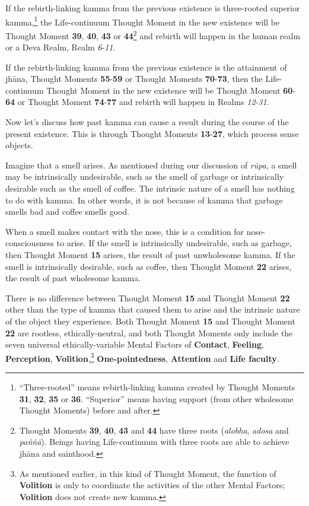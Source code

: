 If the rebirth-linking kamma from the previous existence is three-rooted superior kamma,\footnote{“Three-rooted” means rebirth-linking kamma created by Thought Moments \textbf{31}, \textbf{32}, \textbf{35} or \textbf{36}. “Superior” means having support (from other wholesome Thought Moments) before and after.} the Life-continuum Thought Moment in the new existence will be Thought Moment \textbf{39}, \textbf{40}, \textbf{43} or \textbf{44}\footnote{Thought Moments \textbf{39}, \textbf{40}, \textbf{43} and \textbf{44} have three roots (\textit{alobha}, \textit{adosa} and \textit{paññā}). Beings having Life-continuum with three roots are able to achieve jhāna and sainthood.} and rebirth will happen in the human realm or a Deva Realm, Realm \textit{6}-\textit{11}.

If the rebirth-linking kamma from the previous existence is the attainment of jhāna, Thought Moments \textbf{55}-\textbf{59} or Thought Moments \textbf{70}-\textbf{73}, then the Life-continuum Thought Moment in the new existence will be Thought Moment \textbf{60}-\textbf{64} or Thought Moment \textbf{74}-\textbf{77} and rebirth will happen in Realms \textit{12}-\textit{31}.

Now let’s discuss how past kamma can cause a result during the course of the present existence. This is through Thought Moments \textbf{13}-\textbf{27}, which process sense objects.

Imagine that a smell arises. As mentioned during our discussion of \textit{rūpa}, a smell may be intrinsically undesirable, such as the smell of garbage or intrinsically desirable such as the smell of coffee. The intrinsic nature of a smell has nothing to do with kamma. In other words, it is not because of kamma that garbage smells bad and coffee smells good.

When a smell makes contact with the nose, this is a condition for nose-consciousness to arise. If the smell is intrinsically undesirable, such as garbage, then Thought Moment \textbf{15} arises, the result of past unwholesome kamma. If the smell is intrinsically desirable, such as coffee, then Thought Moment \textbf{22} arises, the result of past wholesome kamma.

There is no difference between Thought Moment \textbf{15} and Thought Moment \textbf{22} other than the type of kamma that caused them to arise and the intrinsic nature of the object they experience. Both Thought Moment \textbf{15} and Thought Moment \textbf{22} are rootless, ethically-neutral, and both Thought Moments only include the seven universal ethically-variable Mental Factors of \textbf{Contact}, \textbf{Feeling}, \textbf{Perception}, \textbf{Volition},\footnote{As mentioned earlier, in this kind of Thought Moment, the function of \textbf{Volition} is only to coordinate the activities of the other Mental Factors; \textbf{Volition} does not create new kamma.} \textbf{One-pointedness}, \textbf{Attention} and \textbf{Life faculty}.

